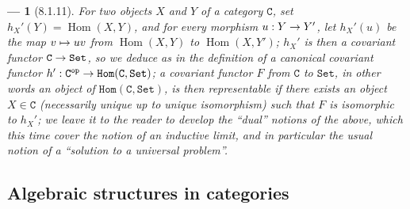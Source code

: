 \documentclass[oneside]{amsart}
\theoremstyle{ega-env-style}
\newtheorem*{env}{---}
\theoremstyle{ega-thm-env-style}
\theoremstyle{ega-defn-env-style}
\def\cat{\mathtt}                   %
\def\C{\cat{C}}                     %
\def\op{^\cat{op}}                  %
\def\Set{\cat{Set}}                 %
\def\CHom{\cat{Hom}}                %
\def\Hom{\operatorname{Hom}}
\renewcommand{\to}{\mathchoice{\longrightarrow}{\rightarrow}{\rightarrow}{\rightarrow}}
\let\mapstoo\mapsto
\renewcommand{\mapsto}{\mathchoice{\longmapsto}{\mapstoo}{\mapstoo}{\mapstoo}}
\let\EGAOriginalLabel\label
\renewcommand{\label}[1]{\phantomsection\EGAOriginalLabel{#1}}
\begin{document}
\begin{env}[8.1.11]
\label{0.8.1.11}
For two objects $X$ and $Y$ of a category $\C$, set $h_X'(Y)=\Hom(X,Y)$, and for every morphism $u:Y\to Y'$, let $h_X'(u)$ be the map $v\mapsto uv$ from $\Hom(X,Y)$ to $\Hom(X,Y')$; $h_X'$ is then a \emph{covariant functor $\C\to\Set$}, so we deduce as in  the definition of a canonical covariant functor $h':\C\op\to\CHom(\C,\Set)$; a \emph{covariant} functor $F$ from $\C$ to $\Set$, in other words an object of $\CHom(\C,\Set)$, is then \emph{representable} if there exists an object $X\in\C$ (necessarily unique up to unique isomorphism) such that $F$ is \emph{isomorphic to $h_X'$}; we leave it to the reader to develop the ``dual'' notions of the above, which this time cover the notion of an \emph{inductive limit}, and in particular the usual notion of a ``solution to a universal problem''.
\end{env}

\subsection{Algebraic structures in categories}
\label{subsection:0.8.2}
\end{document}
